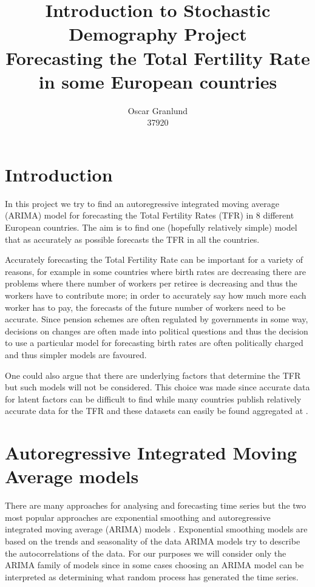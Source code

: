 \documentclass[a4paper, 12pt]{scrartcl}
\title{{\large \textbf{Introduction to Stochastic Demography Project}}\\
{\Large \textbf{Forecasting the Total Fertility Rate in some European countries}}}
\author{{\large Oscar Granlund}\\
{\large 37920}}
\date{}
\begin{document}
\maketitle


\section{Introduction}
In this project we try to find an autoregressive integrated moving average (ARIMA) model for forecasting the Total Fertility Rates (TFR) in 8 different European countries.
The aim is to find one (hopefully relatively simple) model that as accurately as possible forecasts the TFR in all the countries.

Accurately forecasting the Total Fertility Rate can be important for a variety of reasons, for example in some countries where birth rates are decreasing there are problems where there number of workers per retiree is decreasing and thus the workers have to contribute more; in order to accurately say how much more each worker has to pay, the forecasts of the future number of workers need to be accurate.
Since pension schemes are often regulated by governments in some way, decisions on changes are often made into political questions and thus the decision to use a particular model for forecasting birth rates are often politically charged and thus simpler models are favoured.

One could also argue that there are underlying factors that determine the TFR but such models will not be considered.
This choice was made since accurate data for latent factors can be difficult to find while many countries publish relatively accurate data for the TFR and these datasets can easily be found aggregated at \cite{web:TFR}.

\section{Autoregressive Integrated Moving Average models}
There are many approaches for analysing and forecasting time series but the two most popular approaches are exponential smoothing and autoregressive integrated moving average (ARIMA) models \cite{web:fpp}.
Exponential smoothing models are based on the trends and seasonality of the data ARIMA models try to describe the autocorrelations of the data.
For our purposes we will consider only the ARIMA family of models since in some cases choosing an ARIMA model can be interpreted as determining what random process has generated the time series.
\end{document}

